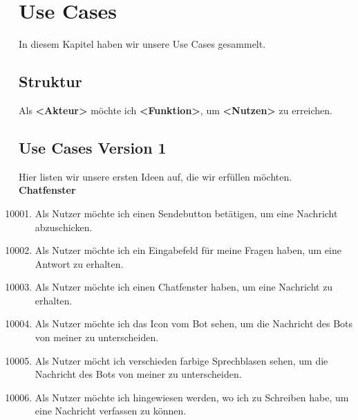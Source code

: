 \section{Use Cases}
In diesem Kapitel haben wir unsere Use Cases gesammelt.

\subsection{Struktur}
Als \textbf{<Akteur>} möchte ich \textbf{<Funktion>}, um \textbf{<Nutzen>} zu erreichen.
\subsection{Use Cases Version 1}
Hier listen wir unsere ersten Ideen auf, die wir erfüllen möchten.
\\

\textbf{Chatfenster}
\begin{enumerate}[leftmargin=*,labelindent=40pt,label=u\arabic*.]
    \setcounter{enumi}{10000}
    \item Als Nutzer möchte ich einen Sendebutton betätigen, um eine Nachricht abzuschicken.
    \item Als Nutzer möchte ich ein Eingabefeld für meine Fragen haben, um eine Antwort zu erhalten.
    \item Als Nutzer möchte ich einen Chatfenster haben, um eine Nachricht zu erhalten.
    \item Als Nutzer möchte ich das Icon vom Bot sehen, um die Nachricht des Bots von meiner zu unterscheiden.
    \item Als Nutzer möcht ich verschieden farbige Sprechblasen sehen, um die Nachricht des Bots von meiner zu unterscheiden.
    \item Als Nutzer möchte ich hingewiesen werden, wo ich zu Schreiben habe, um eine Nachricht verfassen zu können.
\end{enumerate}


